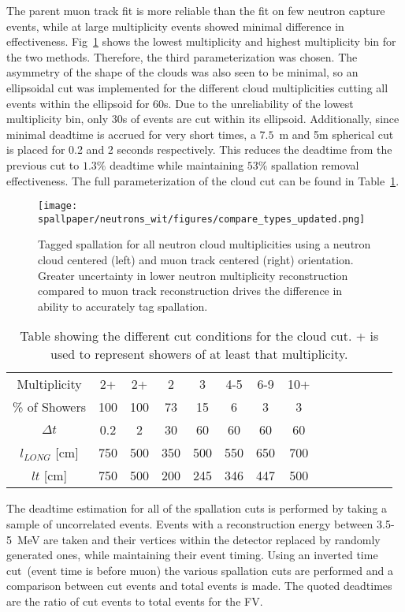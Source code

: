 The parent muon track fit is more reliable than the fit on few neutron capture events, while at large multiplicity events showed minimal difference in effectiveness. Fig~\ref{fig:neutmuoncomp} shows the lowest multiplicity and highest multiplicity bin for the two methods. Therefore, the third parameterization was chosen. The asymmetry of the shape of the clouds was also seen to be minimal, so an ellipsoidal cut was implemented for the different cloud multiplicities cutting all events within the ellipsoid for 60s. Due to the unreliability of the lowest multiplicity bin, only 30s of events are cut within its ellipsoid. Additionally, since minimal deadtime is accrued for very short times, a $7.5$~m and 5m spherical cut is placed for 0.2 and 2 seconds respectively. This reduces the deadtime from the previous cut to $1.3\%$ deadtime while maintaining $53\%$ spallation removal effectiveness. The full parameterization of the cloud cut can be found in Table~\ref{tab:cloudtab}. 

\begin{figure}
    \centering
    \texttt{[image: spallpaper/neutrons\_wit/figures/compare\_types\_updated.png]}
    \caption{Tagged spallation for all neutron cloud multiplicities using a neutron cloud centered (left) and muon track centered (right) orientation. Greater uncertainty in lower neutron multiplicity reconstruction compared to muon track reconstruction drives the difference in ability to accurately tag spallation.}
    \label{fig:neutmuoncomp}
\end{figure}

\begin{table}[t]
    \centering
    \begin{tabular}{ | *{14}{c|} }
    \hline Multiplicity  & 2+ & 2+ & 2 & 3 & 4-5 & 6-9 & 10+ \\
    \% of Showers & 100 & 100 & 73 & 15 & 6 & 3 & 3  \\\hline
    $\Delta t$  & 0.2 & 2 & 30 & 60 & 60 & 60 & 60 \\\hline
    $l_{LONG}$ [cm] & 750 & 500 & 350 & 500 & 550 & 650 & 700  \\\hline
    $lt$ [cm] & 750 & 500 & 200 & 245 & 346 & 447 & 500 \\\hline
    \end{tabular}
    \caption{Table showing the different cut conditions for the cloud cut. + is used to represent showers of at least that multiplicity.}
    \label{tab:cloudtab}
\end{table}

The deadtime estimation for all of the spallation cuts is performed by taking a sample of uncorrelated events. Events with a reconstruction energy between 3.5-5~MeV are taken and their vertices within the detector replaced by randomly generated ones, while maintaining their event timing. Using an inverted time cut~(event time is before muon) the various spallation cuts are performed and a comparison between cut events and total events is made. The quoted deadtimes are the ratio of cut events to total events for the FV. 